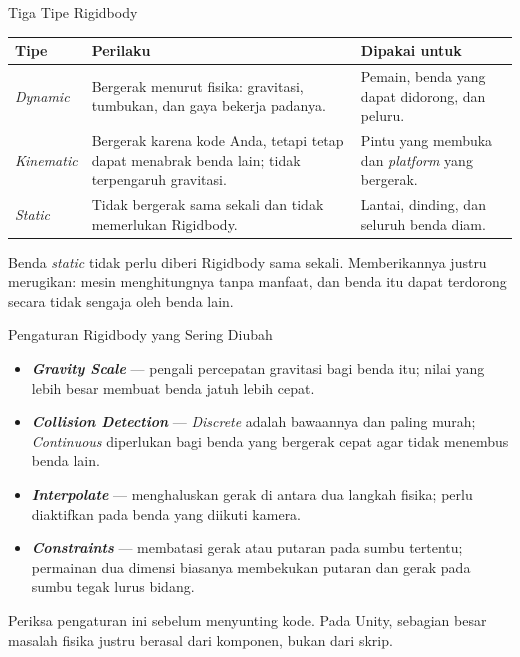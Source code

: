 \documentclass[aspectratio=169,10pt]{beamer}
\begin{document}
\begin{frame}{Tiga Tipe Rigidbody}
{\scriptsize
\renewcommand{\arraystretch}{1.16}
\begin{tabularx}{\textwidth}{@{}>{\raggedright\arraybackslash}p{2.4cm}
    >{\raggedright\arraybackslash}p{5.5cm}
    >{\raggedright\arraybackslash}X@{}}
\toprule
\textbf{Tipe} & \textbf{Perilaku} & \textbf{Dipakai untuk} \\
\midrule
\emph{Dynamic} &
  Bergerak menurut fisika: gravitasi, tumbukan, dan gaya bekerja padanya. &
  Pemain, benda yang dapat didorong, dan peluru. \\
\addlinespace
\emph{Kinematic} &
  Bergerak karena kode Anda, tetapi tetap dapat menabrak benda lain; tidak
  terpengaruh gravitasi. &
  Pintu yang membuka dan \emph{platform} yang bergerak. \\
\addlinespace
\emph{Static} &
  Tidak bergerak sama sekali dan tidak memerlukan Rigidbody. &
  Lantai, dinding, dan seluruh benda diam. \\
\bottomrule
\end{tabularx}}
\vspace{0.16cm}
\begin{kotak}
Benda \emph{static} tidak perlu diberi Rigidbody sama sekali. Memberikannya
justru merugikan: mesin menghitungnya tanpa manfaat, dan benda itu dapat
terdorong secara tidak sengaja oleh benda lain.
\end{kotak}
\end{frame}

\begin{frame}{Pengaturan Rigidbody yang Sering Diubah}
\begin{itemize}
  \item \textbf{\emph{Gravity Scale}} --- pengali percepatan gravitasi bagi
        benda itu; nilai yang lebih besar membuat benda jatuh lebih cepat.
  \item \textbf{\emph{Collision Detection}} --- \emph{Discrete} adalah bawaannya
        dan paling murah; \emph{Continuous} diperlukan bagi benda yang bergerak
        cepat agar tidak menembus benda lain.
  \item \textbf{\emph{Interpolate}} --- menghaluskan gerak di antara dua langkah
        fisika; perlu diaktifkan pada benda yang diikuti kamera.
  \item \textbf{\emph{Constraints}} --- membatasi gerak atau putaran pada sumbu
        tertentu; permainan dua dimensi biasanya membekukan putaran dan gerak
        pada sumbu tegak lurus bidang.
\end{itemize}
\vspace{0.12cm}
\begin{kiat}
Periksa pengaturan ini sebelum menyunting kode. Pada Unity, sebagian besar
masalah fisika justru berasal dari komponen, bukan dari skrip.
\end{kiat}
\end{frame}
\end{document}
